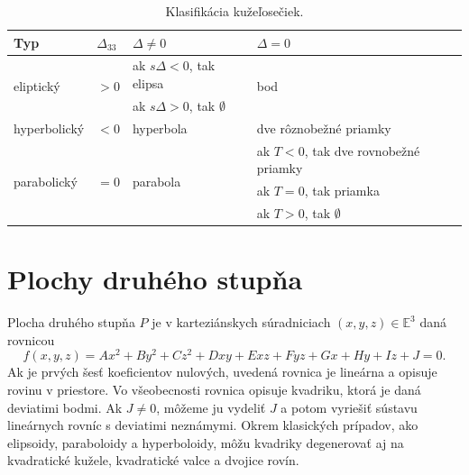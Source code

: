 
\begin{table}[h]
\centering
\begin{tabular}{|l|l|l|l|}
\hline
\textbf{Typ} & $\Delta_{33}$ & $\Delta \neq  0$ & $\Delta = 0 $ \\
\hline
\multirow{2}{*}{eliptický} & \multirow{2}{*}{$> 0$} & ak $s\Delta < 0$, tak elipsa & \multirow{2}{*}{bod} \\
& & ak $s\Delta > 0$, tak $\emptyset$ & \\
\hline
hyperbolický & $< 0$ & hyperbola & dve rôznobežné priamky \\
\hline
\multirow{3}{*}{parabolický} & \multirow{3}{*}{$= 0$} & \multirow{3}{*}{parabola} & ak $T < 0$, tak dve rovnobežné priamky \\
& & & ak $T = 0$, tak priamka \\
& & & ak $T > 0$, tak $\emptyset$ \\
\hline
\end{tabular}
\caption{Klasifikácia kužeľosečiek.}
\label{tab:conic_sections}
\end{table}

\section{Plochy druhého stupňa}
Plocha druhého stupňa $P$ je v karteziánskych súradniciach $(x, y, z) \in \mathbb{E}^3$ daná rovnicou
\[ f(x, y, z) = Ax^2 + By^2 + Cz^2 + Dxy + Exz + Fyz + Gx + Hy + Iz + J = 0. \]
Ak je prvých šesť koeficientov nulových, uvedená rovnica je lineárna a opisuje rovinu v priestore. Vo všeobecnosti rovnica opisuje kvadriku, ktorá je daná deviatimi bodmi. Ak $J \neq 0$, môžeme ju vydeliť $J$ a potom vyriešiť sústavu lineárnych rovníc s deviatimi neznámymi. Okrem klasických prípadov, ako elipsoidy, paraboloidy a hyperboloidy, môžu kvadriky degenerovať aj na kvadratické kužele, kvadratické valce a dvojice rovín.

